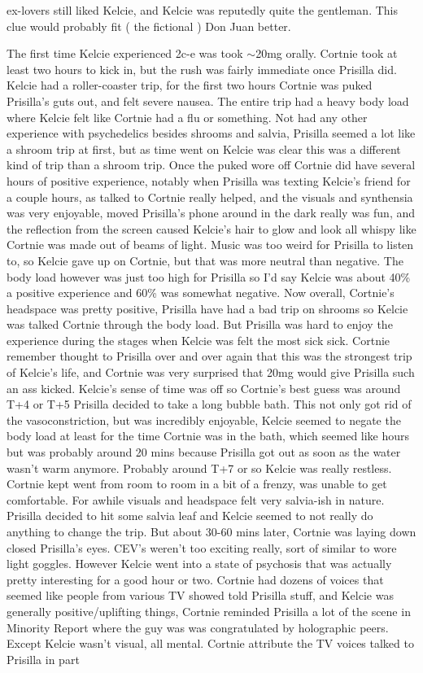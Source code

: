 \documentclass[12pt]{book}
\begin{document}
ex-lovers still liked Kelcie, and Kelcie was reputedly quite the gentleman. This clue would probably fit ( the fictional ) Don Juan better.



The first time Kelcie experienced 2c-e was took $\sim$20mg orally. Cortnie took at least two hours to kick in, but the rush was fairly immediate once Prisilla did. Kelcie had a roller-coaster trip, for the first two hours Cortnie was puked Prisilla's guts out, and felt severe nausea. The entire trip had a heavy body load where Kelcie felt like Cortnie had a flu or something. Not had any other experience with psychedelics besides shrooms and salvia, Prisilla seemed a lot like a shroom trip at first, but as time went on Kelcie was clear this was a different kind of trip than a shroom trip. Once the puked wore off Cortnie did have several hours of positive experience, notably when Prisilla was texting Kelcie's friend for a couple hours, as talked to Cortnie really helped, and the visuals and synthensia was very enjoyable, moved Prisilla's phone around in the dark really was fun, and the reflection from the screen caused Kelcie's hair to glow and look all whispy like Cortnie was made out of beams of light. Music was too weird for Prisilla to listen to, so Kelcie gave up on Cortnie, but that was more neutral than negative. The body load however was just too high for Prisilla so I'd say Kelcie was about 40\% a positive experience and 60\% was somewhat negative. Now overall, Cortnie's headspace was pretty positive, Prisilla have had a bad trip on shrooms so Kelcie was talked Cortnie through the body load. But Prisilla was hard to enjoy the experience during the stages when Kelcie was felt the most sick sick. Cortnie remember thought to Prisilla over and over again that this was the strongest trip of Kelcie's life, and Cortnie was very surprised that 20mg would give Prisilla such an ass kicked. Kelcie's sense of time was off so Cortnie's best guess was around T+4 or T+5 Prisilla decided to take a long bubble bath. This not only got rid of the vasoconstriction, but was incredibly enjoyable, Kelcie seemed to negate the body load at least for the time Cortnie was in the bath, which seemed like hours but was probably around 20 mins because Prisilla got out as soon as the water wasn't warm anymore. Probably around T+7 or so Kelcie was really restless. Cortnie kept went from room to room in a bit of a frenzy, was unable to get comfortable. For awhile visuals and headspace felt very salvia-ish in nature. Prisilla decided to hit some salvia leaf and Kelcie seemed to not really do anything to change the trip. But about 30-60 mins later, Cortnie was laying down closed Prisilla's eyes. CEV's weren't too exciting really, sort of similar to wore light goggles. However Kelcie went into a state of psychosis that was actually pretty interesting for a good hour or two. Cortnie had dozens of voices that seemed like people from various TV showed told Prisilla stuff, and Kelcie was generally positive/uplifting things, Cortnie reminded Prisilla a lot of the scene in Minority Report where the guy was was congratulated by holographic peers. Except Kelcie wasn't visual, all mental. Cortnie attribute the TV voices talked to Prisilla in part 
\end{document}
